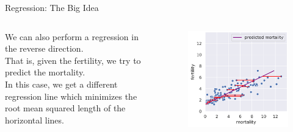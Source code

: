 \documentclass[aspectratio=169]{../latex_main/tntbeamer}  %
\begin{document}
	
	
	\begin{frame}{Regression: The Big Idea}
	    \begin{columns}
	        \begin{column}{.5\textwidth}
	                We can also perform a regression in the reverse direction.\\
	                \bigskip
	                That is, given the fertility, we try to predict the mortality.\\
	                \bigskip
	                In this case, we get a different regression line which minimizes the root mean squared length of the horizontal lines.
	        \end{column}
	        
	        
	        \begin{column}{.5\textwidth}
	                \begin{figure}
	                    \centering
	                    \includegraphics[scale=.5]{Bild21}
	                \end{figure}
	        \end{column}
	        
	        
	    \end{columns}

	\end{frame}
	
\end{document}
